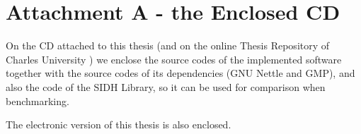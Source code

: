 \documentclass[12pt,a4paper,twoside,openright]{report}
\let\openright=\cleardoublepage
\begin{document}



\tableofcontents











\listoffigures

\listoftables

\renewcommand{\nomname}{List of Abbreviations}


\section*{Attachment A - the Enclosed CD}

On the CD attached to this thesis (and on the online Thesis Repository of Charles University \cite{TRepo}) we enclose
the source codes of the implemented software together with the source codes of its
dependencies (GNU Nettle and GMP), and also the code of the SIDH Library, so it can
be used for comparison when benchmarking.

The electronic version of this thesis is also enclosed.

\openright
\end{document}
